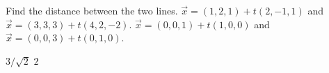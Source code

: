 
\begin{Exercise}[
name={},
title={}, 
difficulty=0,
origin={\cite{GHC}}]
Find the distance between the two lines.
\Question $\vec x = (1,2,1) + t(2,-1,1)$ and 
$\vec x = (3,3,3) + t(4,2,-2)$.
\Question $\vec x = (0,0,1) + t(1,0,0)$ and
$\vec x = (0,0,3) + t(0,1,0)$.
\end{Exercise}

\begin{Answer}
\Question $3/\sqrt{2}$
\Question $2$
\end{Answer}
